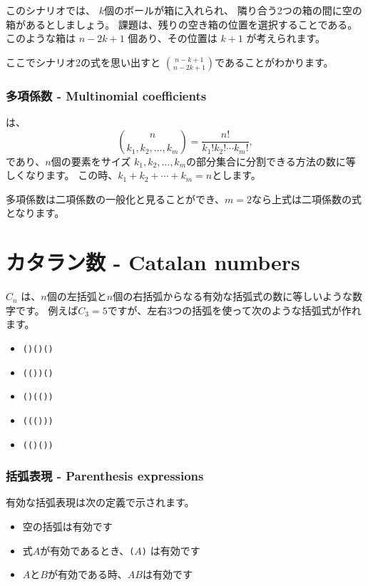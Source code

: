 このシナリオでは、
$k$個のボールが箱に入れられ、
隣り合う2つの箱の間に空の箱があるとしましょう。
課題は、残りの空き箱の位置を選択することである。
このような箱は $n-2k+1$ 個あり、その位置は $k+1$ が考えられます。

ここでシナリオ2の式を思い出すと
${n-k+1 \choose n-2k+1}$であることがわかります。

\subsubsection{多項係数 - Multinomial coefficients}


は、
\[ {n \choose k_1,k_2,\ldots,k_m} = \frac{n!}{k_1! k_2! \cdots k_m!}, \]
であり、$n$個の要素をサイズ $k_1,k_2,\ldots,k_m$の部分集合に分割できる方法の数に等しくなります。
この時、$k_1+k_2+\cdots+k_m=n$とします。

多項係数は二項係数の一般化と見ることができ、$m = 2$なら上式は二項係数の式となります。

\section{カタラン数 - Catalan numbers}


$C_n$ は、$n$個の左括弧と$n$個の右括弧からなる有効な括弧式の数に等しいような数字です。
例えば$C_3=5$ですが、左右3つの括弧を使って次のような括弧式が作れます。

\begin{itemize}[noitemsep]
\item \texttt{()()()}
\item \texttt{(())()}
\item \texttt{()(())}
\item \texttt{((()))}
\item \texttt{(()())}
\end{itemize}

\subsubsection{括弧表現 - Parenthesis expressions}


有効な括弧表現は次の定義で示されます。

\begin{itemize}
\item 空の括弧は有効です
\item 式$A$が有効であるとき、\texttt{(}$A$\texttt{)} は有効です
\item $A$と$B$が有効である時、$AB$は有効です
\end{itemize}

